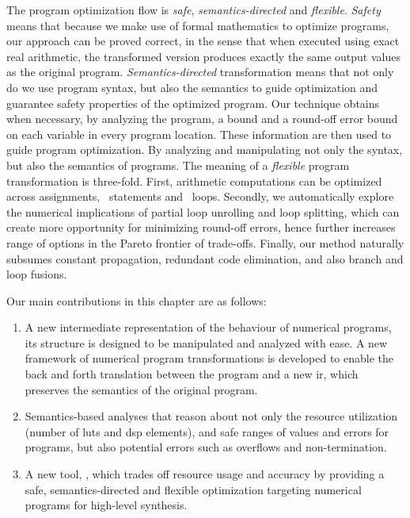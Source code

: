 The program optimization flow is \emph{safe}, \emph{semantics-directed} and
\emph{flexible}. \emph{Safety} means that because we make use of formal
mathematics to optimize programs, our approach can be proved correct, in
the sense that when executed using exact real arithmetic, the transformed
version produces exactly the same output values as the original program.
\emph{Semantics-directed} transformation means that not only do we use
program syntax, but also the semantics to guide optimization and guarantee
safety properties of the optimized program.  Our technique obtains when
necessary, by analyzing the program, a bound and a round-off error bound on
each variable in every program location.  These information are then used
to guide program optimization.  By analyzing and manipulating not only the
syntax, but also the semantics of programs.  The meaning of a \emph{flexible}
program transformation is three-fold.  First, arithmetic computations can be
optimized across assignments, \iflit~statements and \whilelit~loops.  Secondly,
we automatically explore the numerical implications of partial loop unrolling
and loop splitting, which can create more opportunity for minimizing round-off
errors, hence further increases range of options in the Pareto frontier of
trade-offs.  Finally, our method naturally subsumes constant propagation,
redundant code elimination, and also branch and loop fusions.


Our main contributions in this chapter are as follows:
\begin{enumerate}
    \vspace{-6pt}
    \item
        A new intermediate representation of the behaviour of numerical
        programs, its structure is designed to be manipulated and analyzed
        with ease.  A new framework of numerical program transformations is
        developed to enable the back and forth translation between the program
        and a new \gls{ir}, which preserves the semantics of the original
        program.
    \vspace{-6pt}
    \item
        Semantics-based analyses that reason about not only the resource
        utilization (number of \glspl{lut} and \gls{dsp} elements), and safe
        ranges of values and errors for programs, but also potential errors
        such as overflows and non-termination.
    \vspace{-6pt}
    \item
        A new tool, \soap, which trades off resource usage and accuracy
        by providing a safe, semantics-directed and flexible optimization
        targeting numerical programs for high-level synthesis.
    \vspace{-6pt}
\end{enumerate}

